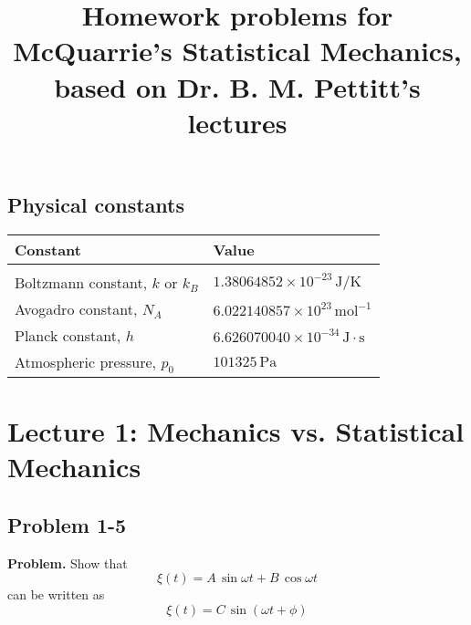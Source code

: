 \documentclass[twocolumn, 10pt]{article}
\numberwithin{equation}{section}
\newenvironment{problem}
{\par\medskip \color{problemblue}
  \textbf{Problem. }\ignorespaces}
{\medskip}
\begin{document}
\title{Homework problems for McQuarrie's Statistical Mechanics, \\
  based on Dr. B. M. Pettitt's lectures}
\author{\vspace{-10ex}}
\date{\vspace{-10ex}}
\maketitle

\tableofcontents

%

\subsection*{Physical constants}

\begin{table}[h]\centering\small
  \begin{tabular}{l l}
    Constant & Value \\
    \hline \\
    Boltzmann constant, $k$ or $k_B$ &
    $1.38064852\times10^{-23} \, \mathrm{J/K}$
    \\
    Avogadro constant, $N_A$ &
    $6.022140857\times10^{23} \, \mathrm{mol}^{-1}$
    \\
    Planck constant, $h$ &
    $6.626070040\times10^{-34} \, \mathrm{J\cdot s}$
    \\
    Atmospheric pressure, $p_0$ &
    $101325 \, \mathrm{Pa}$
  \end{tabular}
\end{table}


\section{Lecture 1: Mechanics vs. Statistical Mechanics}

\subsection{Problem 1-5}

\begin{problem}
  Show that
  $$\xi(t) = A \, \sin \omega t + B \, \cos \omega t$$
  can be written as
  $$\xi(t) = C \, \sin( \omega t + \phi)$$
\end{problem}
\end{document}
